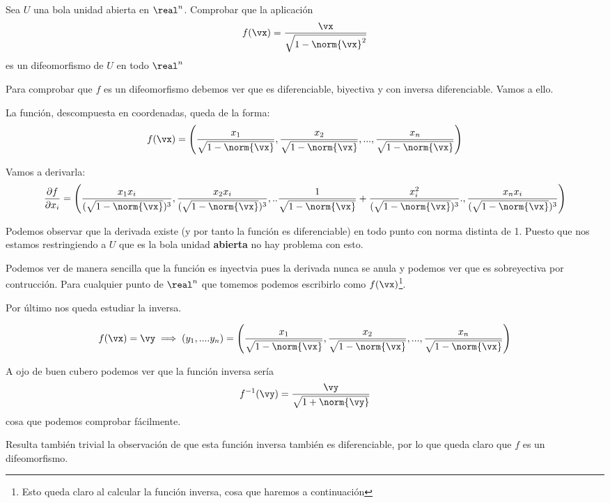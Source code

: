 \begin{problem}[9]
Sea $U$ una bola unidad abierta en $\real^n$. Comprobar que la aplicación
\[f(\vx)=\frac{\vx}{\sqrt{1-\norm{\vx}^2}}\]
es un difeomorfismo de $U$ en todo $\real^n$
\solution

\yoP

Para comprobar que $f$ es un difeomorfismo debemos ver que es diferenciable, biyectiva y con inversa diferenciable. Vamos a ello.

La función, descompuesta en coordenadas, queda de la forma:
\[f(\vx)=\left(\frac{x_1}{\sqrt{1-\norm{\vx}}}, \frac{x_2}{\sqrt{1-\norm{\vx}}}, ..., \frac{x_n}{\sqrt{1-\norm{\vx}}}\right)\]

Vamos a derivarla:
\[\frac{\partial f}{\partial x_i}=\left(\frac{x_1x_i}{(\sqrt{1-\norm{\vx}})^3},\frac{x_2x_i}{(\sqrt{1-\norm{\vx}})^3},..\frac{1}{\sqrt{1-\norm{\vx}}}+\frac{x_i^2}{(\sqrt{1-\norm{\vx}})^3}.,\frac{x_nx_i}{(\sqrt{1-\norm{\vx}})^3}\right)\]

Podemos observar que la derivada existe (y por tanto la función es diferenciable) en todo punto con norma distinta de 1. Puesto que nos estamos restringiendo a $U$ que es la bola unidad \textbf{abierta} no hay problema con esto.

Podemos ver de manera sencilla que la función es inyectvia pues la derivada nunca se anula y podemos ver que es sobreyectiva por contrucción. Para cualquier punto de $\real^n$ que tomemos podemos escribirlo como $f(\vx)$\footnote{Esto queda claro al calcular la función inversa, cosa que haremos a continuación}.

Por último nos queda estudiar la inversa.

\[f(\vx)=\vy \implies (y_1,....y_n)=\left(\frac{x_1}{\sqrt{1-\norm{\vx}}}, \frac{x_2}{\sqrt{1-\norm{\vx}}}, ..., \frac{x_n}{\sqrt{1-\norm{\vx}}}\right)\]

A ojo de buen cubero podemos ver que la función inversa sería
\[f^{-1}(\vy)=\frac{\vy}{\sqrt{1+\norm{\vy}}}\]
cosa que podemos comprobar fácilmente.

Resulta también trivial la observación de que esta función inversa también es diferenciable, por lo que queda claro que $f$ es un difeomorfismo.

\end{problem}



